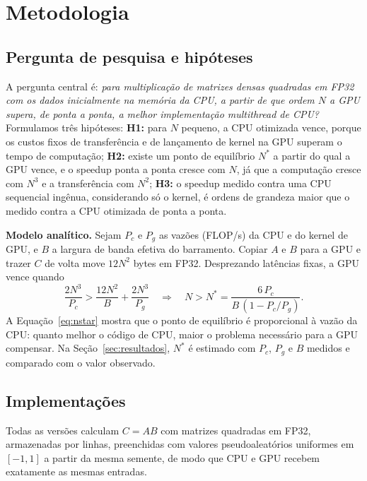 \documentclass[12pt]{article}
\begin{document}
\section{Metodologia}\label{sec:metodologia}

\subsection{Pergunta de pesquisa e hipóteses}

A pergunta central é: \emph{para multiplicação de matrizes densas quadradas em
FP32 com os dados inicialmente na memória da CPU, a partir de que ordem $N$ a
GPU supera, de ponta a ponta, a melhor implementação multithread de CPU?}
Formulamos três hipóteses:
\textbf{H1:} para $N$ pequeno, a CPU otimizada vence, porque os custos fixos de
transferência e de lançamento de kernel na GPU superam o tempo de computação;
\textbf{H2:} existe um ponto de equilíbrio $N^*$ a partir do qual a GPU vence,
e o speedup ponta a ponta cresce com $N$, já que a computação cresce com $N^3$
e a transferência com $N^2$;
\textbf{H3:} o speedup medido contra uma CPU sequencial ingênua, considerando
só o kernel, é ordens de grandeza maior que o medido contra a CPU otimizada
de ponta a ponta.

\textbf{Modelo analítico.} Sejam $P_c$ e $P_g$ as vazões (FLOP/s) da CPU e do
kernel de GPU, e $B$ a largura de banda efetiva do barramento. Copiar $A$ e
$B$ para a GPU e trazer $C$ de volta move $12N^2$ bytes em FP32. Desprezando
latências fixas, a GPU vence quando
\begin{equation}
\frac{2N^3}{P_c} > \frac{12N^2}{B} + \frac{2N^3}{P_g}
\quad\Longrightarrow\quad
N > N^* = \frac{6\,P_c}{B\,(1 - P_c/P_g)}.
\label{eq:nstar}
\end{equation}
A Equação~\ref{eq:nstar} mostra que o ponto de equilíbrio é proporcional à
vazão da CPU: quanto melhor o código de CPU, maior o problema necessário para
a GPU compensar. Na Seção~\ref{sec:resultados}, $N^*$ é estimado com $P_c$,
$P_g$ e $B$ medidos e comparado com o valor observado.

\subsection{Implementações}

Todas as versões calculam $C = AB$ com matrizes quadradas em FP32, armazenadas
por linhas, preenchidas com valores pseudoaleatórios uniformes em $[-1,1]$ a
partir da mesma semente, de modo que CPU e GPU recebem exatamente as mesmas
entradas.
\end{document}
